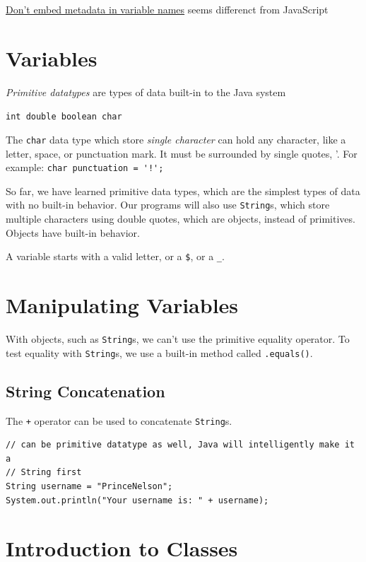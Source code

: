 \documentclass[a4paper, 12pt]{article}
\begin{document}
\href{https://github.com/twitter/commons/blob/master/src/java/com/twitter/common/styleguide.md#dont-embed-metadata-in-variable-names}{Don't embed metadata in variable names} seems differenct from JavaScript


\section{Variables}
\textit{Primitive datatypes} are types of data built-in to the Java system

\verb|int double boolean char|

The \verb|char| data type which store \textit{single character} can hold any character, like a letter, space, or punctuation mark. It must be surrounded by single quotes, '. For example:
\verb|char punctuation = '!';|

So far, we have learned primitive data types, which are the simplest types of data with no built-in behavior. Our programs will also use \verb|String|s, which store multiple characters using double quotes, which are objects, instead of primitives. Objects have built-in behavior.

A variable starts with a valid letter, or a \verb|$|, or a \verb|_|.


\section{Manipulating Variables}
With objects, such as \verb|String|s, we can't use the primitive equality operator. To test equality with \verb|String|s, we use a built-in method called \verb|.equals()|.
\subsection{String Concatenation}
The \verb|+| operator can be used to concatenate \verb|String|s.
\begin{verbatim}
// can be primitive datatype as well, Java will intelligently make it a 
// String first
String username = "PrinceNelson";
System.out.println("Your username is: " + username);
\end{verbatim}


\section{Introduction to Classes}
\end{document}
